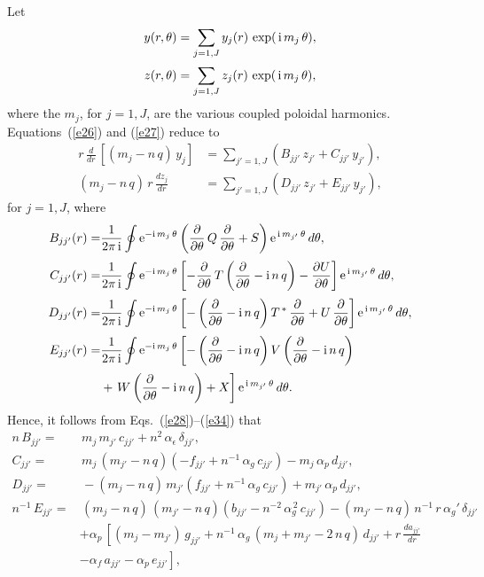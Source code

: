 \documentclass[12pt,prb,aps,notitlepage]{revtex4-1}
\begin{document}
Let
\begin{align}
y(r,\theta)&= \sum_{j=1,J} y_{j}(r)\,\exp(\,{\rm i}\,m_j\,\theta),\\[0.5ex]
z(r,\theta)&= \sum_{j=1,J} z_{j}(r)\,\exp(\,{\rm i}\,m_j\,\theta),
\end{align}
where the $m_j$, for $j=1,J$, are the various coupled poloidal harmonics. 
Equations~(\ref{e26}) and (\ref{e27}) reduce to 
\begin{align}\label{e41}
r\,\frac{d}{dr}\,[(m_j-n\,q)\,y_j] &= \sum_{j'=1,J}\left(B_{jj'}\,z_{j'}+ C_{jj'}\,y_{j'}\right),\\[0.5ex]
(m_j-n\,q)\,r\,\frac{dz_j}{dr}&= \sum_{j'=1,J}\left(D_{jj'}\,z_{j'} + E_{jj'}\,y_{j'}\right),\label{e42}
\end{align}
for $j=1,J$, 
where
\begin{align}
B_{jj'}(r) =& \frac{1}{2\pi\,{\rm i}}\oint {\rm e}^{-{\rm i}\,m_j\,\theta}\left(\frac{\partial}{\partial\theta}\,Q\,\frac{\partial}{\partial\theta} + S\right){\rm e}^{\,{\rm i}\,m_{j'}\,\theta}\,d\theta,\\[0.5ex]
C_{jj'}(r) =& \frac{1}{2\pi\,{\rm i}}\oint {\rm e}^{-{\rm i}\,m_j\,\theta}\left[-\frac{\partial}{\partial\theta}\,T\left(\frac{\partial}{\partial\theta}-{\rm i}\,n\,q\right)-\frac{\partial U}{\partial\theta}
\right]{\rm e}^{\,{\rm i}\,m_{j'}\,\theta}\,d\theta,\\[0.5ex]
D_{jj'}(r) =& \frac{1}{2\pi\,{\rm i}}\oint {\rm e}^{-{\rm i}\,m_j\,\theta}\left[-\left(\frac{\partial}{\partial\theta}-{\rm i}\,n\,q\right)
T^{\,\ast}\,\frac{\partial}{\partial\theta}+U\,\frac{\partial}{\partial\theta}
\right]{\rm e}^{\,{\rm i}\,m_{j'}\,\theta}\,d\theta,\\[0.5ex]
E_{jj'} (r)=& \frac{1}{2\pi\,{\rm i}}\oint {\rm e}^{-{\rm i}\,m_j\,\theta}\left[-\left(\frac{\partial}{\partial\theta}-{\rm i}\,n\,q\right)V\left(\frac{\partial}{\partial\theta}-{\rm i}\,n\,q\right) \right.\nonumber\\[0.5ex]
&+ \left.W\left(\frac{\partial}{\partial\theta}-{\rm i}\,n\,q\right)+ X
\right]{\rm e}^{\,{\rm i}\,m_{j'}\,\theta}\,d\theta.
\end{align}
Hence, it follows from Eqs.~(\ref{e28})--(\ref{e34}) that
\begin{align}
n\,B_{jj'} =& \,m_j\,m_{j'}\,c_{jj'} + n^2\,\alpha_\epsilon\,\delta_{jj'},\\[0.5ex]
C_{jj'} =&\,m_j\,(m_{j'}-n\,q)\left(-f_{jj'}+n^{-1}\,\alpha_g\,c_{jj'}\right)-m_j\,\alpha_p\,d_{jj'},\\[0.5ex]
D_{jj'} =&\,-(m_j-n\,q)\,m_{j'}\left(f_{jj'}+n^{-1}\,\alpha_g\,c_{jj'}\right) + m_{j'}\,\alpha_p\,d_{jj'},\\[0.5ex]
n^{-1}\,E_{jj'}=&\, (m_j-n\,q)\,(m_{j'}-n\,q)\left(b_{jj'}-n^{-2}\,\alpha_g^{\,2}\,c_{jj'}\right) - (m_{j'}-n\,q)\,n^{-1}\,r\,\alpha_g'\,\delta_{jj'}\nonumber\\[0.5ex]
&+\alpha_p\,\left[(m_j-m_{j'})\,g_{jj'}+n^{-1}\,\alpha_g\,(m_j+m_{j'}-2\,n\,q)\,d_{jj'}+ r\,\frac{d a_{jj'}}{dr}\right.\nonumber\\[0.5ex]
&\left.-\alpha_f\,a_{jj'}-\alpha_p\,e_{jj'}\right],
\end{align}
\end{document}
